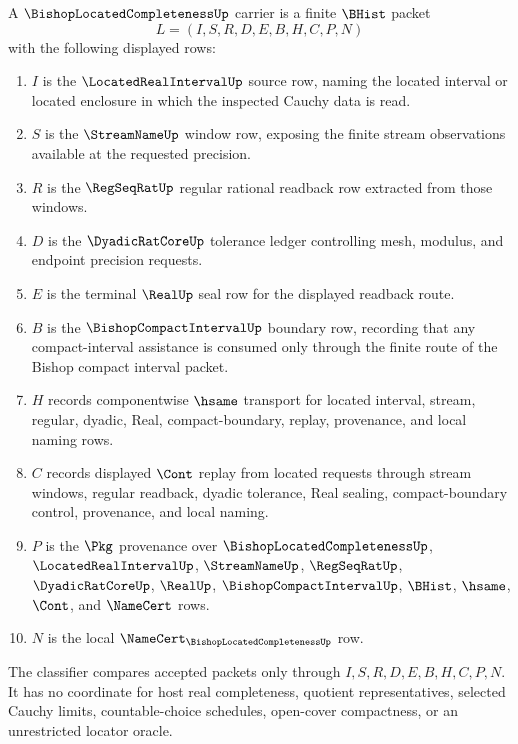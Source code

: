 \begin{definition}
\label{def:bishop-located-completeness-carrier}
A $\BishopLocatedCompletenessUp$ carrier is a finite $\BHist$ packet
$$
L=(I,S,R,D,E,B,H,C,P,N)
$$
with the following displayed rows:
\begin{enumerate}
\item $I$ is the $\LocatedRealIntervalUp$ source row, naming the located interval or located enclosure in which the inspected Cauchy data is read.
\item $S$ is the $\StreamNameUp$ window row, exposing the finite stream observations available at the requested precision.
\item $R$ is the $\RegSeqRatUp$ regular rational readback row extracted from those windows.
\item $D$ is the $\DyadicRatCoreUp$ tolerance ledger controlling mesh, modulus, and endpoint precision requests.
\item $E$ is the terminal $\RealUp$ seal row for the displayed readback route.
\item $B$ is the $\BishopCompactIntervalUp$ boundary row, recording that any compact-interval assistance is consumed only through the finite route of the Bishop compact interval packet.
\item $H$ records componentwise $\hsame$ transport for located interval, stream, regular, dyadic, Real, compact-boundary, replay, provenance, and local naming rows.
\item $C$ records displayed $\Cont$ replay from located requests through stream windows, regular readback, dyadic tolerance, Real sealing, compact-boundary control, provenance, and local naming.
\item $P$ is the $\Pkg$ provenance over $\BishopLocatedCompletenessUp$, $\LocatedRealIntervalUp$, $\StreamNameUp$, $\RegSeqRatUp$, $\DyadicRatCoreUp$, $\RealUp$, $\BishopCompactIntervalUp$, $\BHist$, $\hsame$, $\Cont$, and $\NameCert$ rows.
\item $N$ is the local $\NameCert_{\BishopLocatedCompletenessUp}$ row.
\end{enumerate}
The classifier compares accepted packets only through $I,S,R,D,E,B,H,C,P,N$. It has no coordinate for host real completeness, quotient representatives, selected Cauchy limits, countable-choice schedules, open-cover compactness, or an unrestricted locator oracle.
\end{definition}

